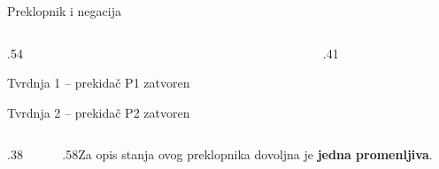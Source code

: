 \begin{frame}[label=01-s007]{Preklopnik i negacija}
\begin{columns}[c,onlytextwidth]\begin{column}{.54\textwidth}\centering \par{\fontsize{11}{13}\selectfont Tvrdnja 1 – prekidač P1 zatvoren\par Tvrdnja 2 – prekidač P2 zatvoren\par}\end{column}\begin{column}{.41\textwidth}\centering \par{}\end{column}\end{columns}
\medskip{}
\medskip\begin{columns}[c,onlytextwidth]\begin{column}{.38\textwidth}\centering \end{column}\begin{column}{.58\textwidth}Za opis stanja ovog preklopnika dovoljna je \textbf{jedna promenljiva}.\end{column}\end{columns}
\end{frame}

